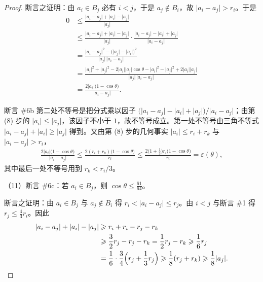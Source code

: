 \documentclass[../../main.tex]{subfiles}%
\begin{document}
\begin{proof}
断言之证明：由 $a_i\in B_j$ 必有 $i<j$，于是 $a_j\notin B_i$，故 $\lvert a_i-a_j\rvert>r_i$。于是
\begin{align*}
0&\leqslant\frac{\lvert a_i-a_j\rvert+\lvert a_i\rvert-\lvert a_j\rvert}{\lvert a_j\rvert}\\
&\leqslant\frac{\lvert a_i-a_j\rvert+\lvert a_i\rvert-\lvert a_j\rvert}{\lvert a_j\rvert}\cdot\frac{\lvert a_i-a_j\rvert-\lvert a_i\rvert+\lvert a_j\rvert}{\lvert a_i-a_j\rvert}\\
&=\frac{\lvert a_i-a_j\rvert^{2}-\bigl(\lvert a_j\rvert-\lvert a_i\rvert\bigr)^{2}}{\lvert a_j\rvert\,\lvert a_i-a_j\rvert}\\
&=\frac{\lvert a_i\rvert^{2}+\lvert a_j\rvert^{2}-2\lvert a_i\rvert\lvert a_j\rvert\cos\theta-\lvert a_i\rvert^{2}-\lvert a_j\rvert^{2}+2\lvert a_i\rvert\lvert a_j\rvert}{\lvert a_j\rvert\,\lvert a_i-a_j\rvert}\\
&=\frac{2\lvert a_i\rvert\bigl(1-\cos\theta\bigr)}{\lvert a_i-a_j\rvert}.
\end{align*}


断言 \#6b 第二处不等号是把分式乘以因子 $\bigl(\lvert a_i-a_j\rvert-\lvert a_i\rvert+\lvert a_j\rvert\bigr)/\lvert a_i-a_j\rvert$；由第 (8) 步的 $\lvert a_i\rvert\leqslant\lvert a_j\rvert$，该因子不小于 $1$，故不等号成立。第一处不等号由三角不等式 $\lvert a_i-a_j\rvert+\lvert a_i\rvert\geqslant\lvert a_j\rvert$ 得到。又由第 (8) 步的几何事实 $\lvert a_i\rvert\leqslant r_i+r_k$ 与 $\lvert a_i-a_j\rvert>r_i$，
\begin{align*}
\frac{2\lvert a_i\rvert\bigl(1-\cos\theta\bigr)}{\lvert a_i-a_j\rvert}
\leqslant\frac{2(r_i+r_k)\bigl(1-\cos\theta\bigr)}{r_i}
\leqslant\frac{2\bigl(1+\frac{1}{3}\bigr)r_i\bigl(1-\cos\theta\bigr)}{r_i}
=\varepsilon(\theta),
\end{align*}
其中最后一处不等号用到 $r_k<r_i/3$。

（11）断言 \#6c：若 $a_i\in B_j$，则 $\cos\theta\leqslant\frac{61}{64}$。

断言之证明：由 $a_i\in B_j$ 与 $a_j\notin B_i$ 得 $r_i<\lvert a_i-a_j\rvert\leqslant r_j$。由 $i<j$ 与断言 \#1 得 $r_j\leqslant\frac{4}{3}r_i$。因此
\begin{align*}
\lvert a_i-a_j\rvert+\lvert a_i\rvert-\lvert a_j\rvert
&\geqslant r_i+r_i-r_j-r_k\\
&\geqslant\frac{3}{2}r_j-r_j-r_k
=\frac{1}{2}r_j-r_k\geqslant\frac{1}{6}r_j\\
&=\frac{1}{6}\cdot\frac{3}{4}\Bigl(r_j+\frac{1}{3}r_j\Bigr)\geqslant\frac{1}{8}(r_j+r_k)
\geqslant\frac{1}{8}\lvert a_j\rvert .
\end{align*}


\end{proof}
\end{document}
